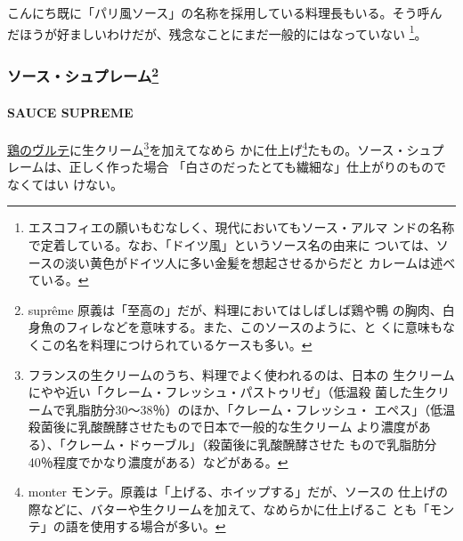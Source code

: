 \begin{recette}
こんにち既に「パリ風ソース」の名称を採用している料理長もいる。そう呼ん
だほうが好ましいわけだが、残念なことにまだ一般的にはなっていない
\footnote{エスコフィエの願いもむなしく、現代においてもソース・アルマ
  ンドの名称で定着している。なお、「ドイツ風」というソース名の由来に
  ついては、ソースの淡い黄色がドイツ人に多い金髪を想起させるからだと
  カレームは述べている。}。

\maeaki

\hypertarget{ux30bdux30fcux30b9ux30b7ux30e5ux30d7ux30ecux30fcux30e0102023}{%
\subsubsection[ソース・シュプレーム]{\texorpdfstring{ソース・シュプレーム\footnote{suprême
  原義は「至高の」だが、料理においてはしばしば鶏や鴨
  の胸肉、白身魚のフィレなどを意味する。また、このソースのように、と
  くに意味もなくこの名を料理につけられているケースも多い。}}{ソース・シュプレーム}}\label{ux30bdux30fcux30b9ux30b7ux30e5ux30d7ux30ecux30fcux30e0102023}}

\hypertarget{sauce-supreme}{%
\paragraph{SAUCE SUPREME}\label{sauce-supreme}}


\protect\hyperlink{veloute-de-volaille}{鶏のヴルテ}に生クリーム\footnote{フランスの生クリームのうち、料理でよく使われるのは、日本の
  生クリームにやや近い「クレーム・フレッシュ・パストゥリゼ」（低温殺
  菌した生クリームで乳脂肪分30〜38％）のほか、「クレーム・フレッシュ・
  エペス」（低温殺菌後に乳酸醗酵させたもので日本で一般的な生クリーム
  より濃度がある）、「クレーム・ドゥーブル」（殺菌後に乳酸醗酵させた
  もので乳脂肪分40％程度でかなり濃度がある）などがある。}を加えてなめら
かに仕上げ\footnote{monter
  モンテ。原義は「上げる、ホイップする」だが、ソースの
  仕上げの際などに、バターや生クリームを加えて、なめらかに仕上げるこ
  とも「モンテ」の語を使用する場合が多い。}たもの。ソース・シュプレームは、正しく作った場合
「白さのだったとても繊細な」仕上がりのものでなくてはい
けない。


\end{recette}
